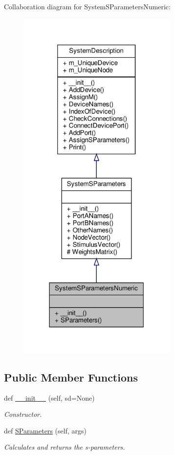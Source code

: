Collaboration diagram for System\+S\+Parameters\+Numeric\+:\nopagebreak
\begin{figure}[H]
\begin{center}
\leavevmode
\includegraphics[width=224pt]{classSignalIntegrity_1_1SystemDescriptions_1_1SystemSParametersNumeric_1_1SystemSParametersNumeric__coll__graph}
\end{center}
\end{figure}
\subsection*{Public Member Functions}
\begin{DoxyCompactItemize}
\item 
def \hyperlink{classSignalIntegrity_1_1SystemDescriptions_1_1SystemSParametersNumeric_1_1SystemSParametersNumeric_a2fa2ae61a4511a760e2d2047ec07eb05}{\+\_\+\+\_\+init\+\_\+\+\_\+} (self, sd=None)
\begin{DoxyCompactList}\small\item\em Constructor. \end{DoxyCompactList}\item 
def \hyperlink{classSignalIntegrity_1_1SystemDescriptions_1_1SystemSParametersNumeric_1_1SystemSParametersNumeric_a021c12a7e391dbcb5904bb9a1e3c6294}{S\+Parameters} (self, args)
\begin{DoxyCompactList}\small\item\em Calculates and returns the s-\/parameters. \end{DoxyCompactList}\end{DoxyCompactItemize}
